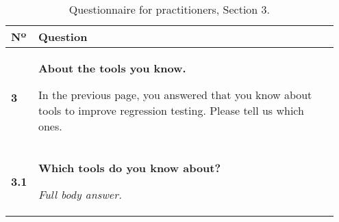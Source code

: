 \begin{table}[]
\centering
\small
{}
\begin{tabular}{p{0.05\linewidth}p{0.9\linewidth}}
\toprule
\textbf{Nº} & \textbf{Question} \\
\midrule
\textbf{3} & \textbf{About the tools you know.}

In the previous page, you answered that you know about tools to improve regression testing. Please tell us which ones.	\\

\textbf{3.1} & \textbf{Which tools do you know about?}

\textit{Full body answer.}\\
\bottomrule
\end{tabular}\\
\caption{Questionnaire for practitioners, Section 3.}
\label{table:interview_questions}
\end{table}

